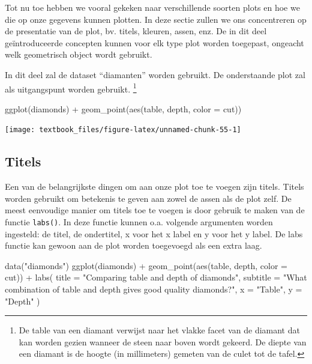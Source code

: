 \documentclass[]{tufte-book}
\newenvironment{Shaded}{}{}
\newcommand{\AttributeTok}[1]{\textcolor[rgb]{0.49,0.56,0.16}{#1}}
\newcommand{\FunctionTok}[1]{\textcolor[rgb]{0.02,0.16,0.49}{#1}}
\newcommand{\NormalTok}[1]{#1}
\newcommand{\SpecialCharTok}[1]{\textcolor[rgb]{0.25,0.44,0.63}{#1}}
\newcommand{\StringTok}[1]{\textcolor[rgb]{0.25,0.44,0.63}{#1}}
\begin{document}
Tot nu toe hebben we vooral gekeken naar verschillende soorten plots en hoe we die op onze gegevens kunnen plotten. In deze sectie zullen we ons concentreren op de presentatie van de plot, bv. titels, kleuren, assen, enz. De in dit deel geïntroduceerde concepten kunnen voor elk type plot worden toegepast, ongeacht welk geometrisch object wordt gebruikt.

In dit deel zal de dataset ``diamanten'' worden gebruikt. De onderstaande plot zal als uitgangspunt worden gebruikt. \footnote{De table van een diamant verwijst naar het vlakke facet van de diamant dat kan worden gezien wanneer de steen naar boven wordt gekeerd. De diepte van een diamant is de hoogte (in millimeters) gemeten van de culet tot de tafel.}

\begin{Shaded}
\begin{Highlighting}[]
\FunctionTok{ggplot}\NormalTok{(diamonds) }\SpecialCharTok{+}
  \FunctionTok{geom\_point}\NormalTok{(}\FunctionTok{aes}\NormalTok{(table, depth, }\AttributeTok{color =}\NormalTok{ cut))}
\end{Highlighting}
\end{Shaded}

\texttt{[image: textbook\_files/figure-latex/unnamed-chunk-55-1]}

\hypertarget{titels}{%
\subsection{Titels}\label{titels}}

Een van de belangrijkste dingen om aan onze plot toe te voegen zijn titels. Titels worden gebruikt om betekenis te geven aan zowel de assen als de plot zelf. De meest eenvoudige manier om titels toe te voegen is door gebruik te maken van de functie \texttt{labs()}. In deze functie kunnen o.a. volgende argumenten worden ingesteld: de titel, de ondertitel, x voor het x label en y voor het y label. De labs functie kan gewoon aan de plot worden toegevoegd als een extra laag.

\begin{Shaded}
\begin{Highlighting}[]
\FunctionTok{data}\NormalTok{(}\StringTok{"diamonds"}\NormalTok{)}
\FunctionTok{ggplot}\NormalTok{(diamonds) }\SpecialCharTok{+}
  \FunctionTok{geom\_point}\NormalTok{(}\FunctionTok{aes}\NormalTok{(table, depth, }\AttributeTok{color =}\NormalTok{ cut)) }\SpecialCharTok{+}
  \FunctionTok{labs}\NormalTok{(}
    \AttributeTok{title =} \StringTok{"Comparing table and depth of diamonds"}\NormalTok{,}
    \AttributeTok{subtitle =} \StringTok{"What combination of table and depth gives good quality diamonds?"}\NormalTok{,}
    \AttributeTok{x =} \StringTok{"Table"}\NormalTok{,}
    \AttributeTok{y =} \StringTok{"Depth"}
\NormalTok{  )}
\end{Highlighting}
\end{Shaded}
\end{document}
